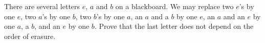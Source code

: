 There are several letters $e$, $a$ and $b$ on a blackboard. We may replace two $e$'s by one $e$, two $a$'s by one $b$, two $b$'s by one $a$, an $a$ and a $b$ by one $e$, an $a$ and an $e$ by one $a$, a $b$, and an $e$ by one $b$. Prove that the last letter does not depend on the order of erasure.
